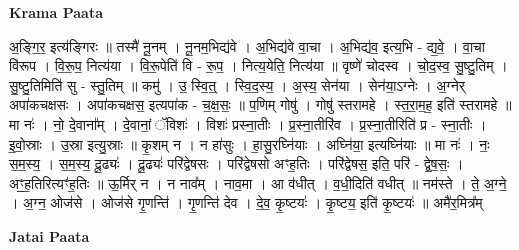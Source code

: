 \documentclass[17pt]{extarticle}
\begin{document}
\textbf{Krama Paata} \newline

अ॒ङ्गि॒र॒ इत्य॑ङ्गिरः ॥ तस्मै॑ नू॒नम् । नू॒नम॒भिद्य॑वे । अ॒भिद्य॑वे वा॒चा । अ॒भिद्य॑व॒ इत्य॒भि - द्य॒वे॒ । वा॒चा वि॑रूप । वि॒रू॒प॒ नित्य॑या । वि॒रू॒पेति॑ वि - रू॒प॒ । नित्य॒येति॒ नित्य॑या ॥ वृष्णे॑ चोदस्व । चो॒द॒स्व॒ सु॒ष्टु॒तिम् । सु॒ष्टु॒तिमिति॑ सु - स्तु॒तिम् ॥  कमु॑ । उ॒ स्वि॒त्॒ । स्वि॒द॒स्य॒ । अ॒स्य॒ सेन॑या । सेन॑या॒ऽग्नेः । अ॒ग्नेर् अपा॑कचक्षसः । अपा॑कचक्षस॒ इत्यपा॑क - च॒क्ष॒सः॒ ॥ प॒णिम् गोषु॑ । गोषु॑ स्तरामहे । स्त॒रा॒म॒ह॒ इति॑ स्तरामहे ॥ मा नः॑ । नो॒ दे॒वाना᳚म् । दे॒वानां॒ ॅविशः॑ । विशः॑ प्रस्ना॒तीः । प्र॒स्ना॒तीरि॑व । प्र॒स्ना॒तीरिति॑ प्र - स्ना॒तीः । इ॒वो॒स्राः । उ॒स्रा इत्यु॒स्राः ॥ कृ॒शम् न । न हा॑सुः । हा॒सु॒रघ्नि॑याः । अघ्नि॑या॒ इत्यघ्नि॑याः ॥ मा नः॑ । नः॒ स॒म॒स्य॒ । स॒म॒स्य॒ दू॒ढ्यः॑ । दू॒ढ्यः॑ परि॑द्वेषसः । परि॑द्वेषसो अꣳह॒तिः । परि॑द्वेषस॒ इति॒ परि॑ - द्वे॒ष॒सः॒ । अꣳ॒॒ह॒तिरित्यꣳ॑ह॒तिः ॥ ऊ॒र्मिर् न । न नाव᳚म् । नाव॒मा । आ व॑धीत् । व॒धी॒दिति॑ वधीत् ॥ नम॑स्ते । ते॒ अ॒ग्ने॒ । अ॒ग्न॒ ओज॑से । ओज॑से गृ॒णन्ति॑ । गृ॒णन्ति॑ देव । दे॒व॒ कृ॒ष्टयः॑ । कृ॒ष्टय॒ इति॑ कृ॒ष्टयः॑ ॥ अमै॑र॒मित्र᳚म् \newline

\textbf{Jatai Paata} \newline
\end{document}
